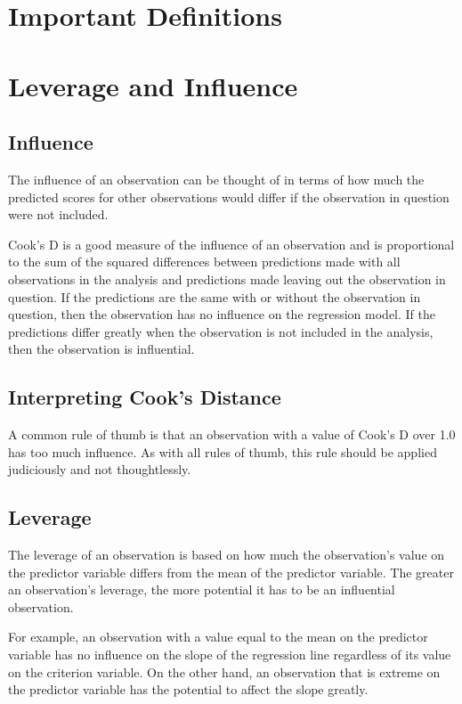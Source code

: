\documentclass[Chap5amain.tex]{subfiles}
\begin{document}
\section{Important Definitions}
\section{Leverage and Influence}
\subsection{Influence}
The influence of an observation can be thought of in terms of how much the predicted scores for other observations would differ if the observation in question were not included. 

Cook's D is a good measure of the influence of an observation and is proportional to the sum of the squared differences between predictions made with all observations in the analysis and predictions made leaving out the observation in question. If the predictions are the same with or without the observation in question, then the observation has no influence on the regression model. If the predictions differ greatly when the observation is not included in the analysis, then the observation is influential.

\subsection{Interpreting Cook's Distance}
A common rule of thumb is that an observation with a value of Cook's D over 1.0 has too much influence. As with all rules of thumb, this rule should be applied judiciously and not thoughtlessly.

\subsection{Leverage}
The leverage of an observation is based on how much the observation's value on the predictor variable differs from the mean of the predictor variable. The greater an observation's leverage, the more potential it has to be an influential observation. 

For example, an observation with a value equal to the mean on the predictor variable has no influence on the slope of the regression line regardless of its value on the criterion variable. On the other hand, an observation that is extreme on the predictor variable has the potential to affect the slope greatly.
\end{document}
